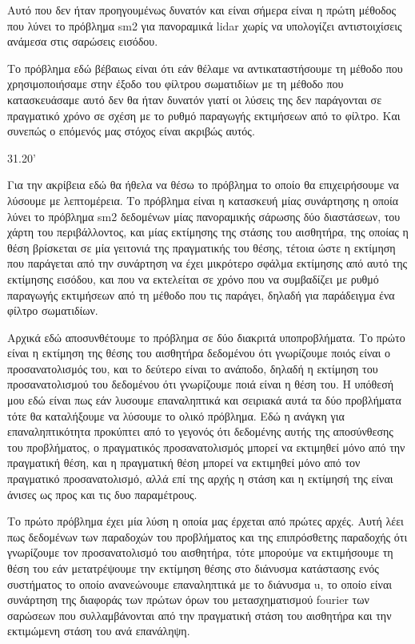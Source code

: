 \documentclass[a4paper,10pt]{article}
\begin{document}
Αυτό που δεν ήταν προηγουμένως δυνατόν και είναι σήμερα είναι η πρώτη μέθοδος
που λύνει το πρόβλημα sm2 για πανοραμικά lidar χωρίς να υπολογίζει
αντιστοιχίσεις ανάμεσα στις σαρώσεις εισόδου.

Το πρόβλημα εδώ βέβαιως είναι ότι εάν θέλαμε να αντικαταστήσουμε τη μέθοδο που
χρησιμοποιήσαμε στην έξοδο του φίλτρου σωματιδίων με τη μέθοδο που
κατασκευάσαμε αυτό δεν θα ήταν δυνατόν γιατί οι λύσεις της δεν παράγονται σε
πραγματικό χρόνο σε σχέση με το ρυθμό παραγωγής εκτιμήσεων από το φίλτρο.  Και
συνεπώς ο επόμενός μας στόχος είναι ακριβώς αυτός.


31.20'



Για την ακρίβεια εδώ θα ήθελα να θέσω το πρόβλημα το οποίο θα επιχειρήσουμε
να λύσουμε με λεπτομέρεια. Το πρόβλημα είναι η κατασκευή μίας συνάρτησης η
οποία λύνει το πρόβλημα sm2 δεδομένων μίας πανοραμικής σάρωσης δύο διαστάσεων,
του χάρτη του περιβάλλοντος, και μίας εκτίμησης της στάσης του αισθητήρα,
της οποίας η θέση βρίσκεται σε μία γειτονιά της πραγματικής του θέσης,
τέτοια ώστε η εκτίμηση που παράγεται από την συνάρτηση να έχει μικρότερο σφάλμα
εκτίμησης από αυτό της εκτίμησης εισόδου, και που να εκτελείται σε χρόνο που
να συμβαδίζει με ρυθμό παραγωγής εκτιμήσεων από τη μέθοδο που τις παράγει,
δηλαδή για παράδειγμα ένα φίλτρο σωματιδίων.


Αρχικά εδώ αποσυνθέτουμε το πρόβλημα σε δύο διακριτά υποπροβλήματα. Το πρώτο
είναι η εκτίμηση της θέσης του αισθητήρα δεδομένου ότι γνωρίζουμε ποιός είναι ο
προσανατολισμός του, και το δεύτερο είναι το ανάποδο, δηλαδή η εκτίμηση του
προσανατολισμού του δεδομένου ότι γνωρίζουμε ποιά είναι η θέση του. Η υπόθεσή
μου εδώ είναι πως εάν λυσουμε επαναληπτικά και σειριακά αυτά τα δύο προβλήματα
τότε θα καταλήξουμε να λύσουμε το ολικό πρόβλημα. Εδώ η ανάγκη για
επαναληπτικότητα προκύπτει από το γεγονός ότι δεδομένης αυτής της αποσύνθεσης
του προβλήματος, ο πραγματικός προσανατολισμός μπορεί να εκτιμηθεί μόνο από την
πραγματική θέση, και η πραγματική θέση μπορεί να εκτιμηθεί μόνο από τον
πραγματικό προσανατολισμό, αλλά επί της αρχής η στάση και η εκτίμησή της είναι
άνισες ως προς και τις δυο παραμέτρους.


Το πρώτο πρόβλημα έχει μία λύση η οποία μας έρχεται από πρώτες αρχές. Αυτή λέει
πως δεδομένων των παραδοχών του προβλήματος και της επιπρόσθετης παραδοχής ότι
γνωρίζουμε τον προσανατολισμό του αισθητήρα, τότε μπορούμε να εκτιμήσουμε τη
θέση του εάν μετατρέψουμε την εκτίμηση θέσης στο διάνυσμα κατάστασης
ενός συστήματος το οποίο ανανεώνουμε επαναληπτικά με το διάνυσμα u, το οποίο
είναι συνάρτηση της διαφοράς των πρώτων όρων του μετασχηματισμού fourier των
σαρώσεων που συλλαμβάνονται από την πραγματική στάση του αισθητήρα και την
εκτιμώμενη στάση του ανά επανάληψη.
\end{document}
